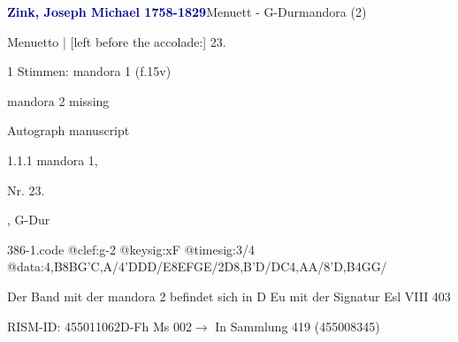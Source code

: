 \documentclass[twocolumn]{book}
\begin{document}
\par \vspace{7pt} \textcolor{darkblue}{\textbf{Zink, Joseph Michael  1758-1829}}\hfillplus{\textbf{[386]}}\newline Menuett - G-Dur\newline mandora (2)
\par \begin{itshape}[f.15v, at left:] Menuetto | [left before the accolade:] 23.\end{itshape} 
\par \textcolor{darkblue}{}  1 Stimmen: mandora 1  (f.15v)\newline \begin{small} mandora 2 missing\end{small} \newline Autograph manuscript
\par 1.1.1  mandora 1, \begin{itshape}Nr. 23.\end{itshape}, G-Dur  
\begin{filecontents*}{386-1.code}
@clef:g-2
@keysig:xF
@timesig:3/4
@data:4,B8BG'C,A/4'DDD/E8EFGE/2D{8,B'D}/{DC}4,AA/8'D,B4GG/
\end{filecontents*}
\newline
%
\par Der Band mit der mandora 2 befindet sich in D Eu mit der Signatur Esl VIII 403
\par RISM-ID: 455011062\newline D-Fh  Ms 002\newline $\rightarrow$ In Sammlung 419 (455008345)
      
\end{document}
